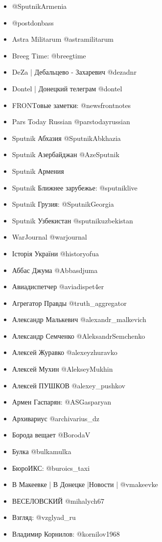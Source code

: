\begin{itemize}

\item @SputnikArmenia
\item @postdonbass 
\item Astra Militarum @astramilitarum
\item Breeg Time: @breegtime
\item DeZa | Дебальцево - Захаревич @dezadnr
\item Dontel | Донецкий телеграм @dontel 
\item FRONTовые заметки: @newsfrontnotes
\item Pars Today Russian @parstodayrussian 
\item Sputnik Абхазия @SputnikAbkhazia
\item Sputnik Азербайджан @AzeSputnik
\item Sputnik Армения 
\item Sputnik Ближнее зарубежье: @sputniklive
\item Sputnik Грузия: @SputnikGeorgia
\item Sputnik Узбекистан @sputnikuzbekistan
\item WarJournal @warjournal
\item Історія України @historyofua
\item Аббас Джума @Abbasdjuma
\item Авиадиспетчер @aviadispet4er 
\item Агрегатор Правды @truth\_aggregator
\item Александр Малькевич @alexandr\_malkevich 
\item Александр Семченко @AleksandrSemchenko
\item Алексей Журавко @alexeyzhuravko
\item Алексей Мухин @AlekseyMukhin
\item Алексей ПУШКОВ @alexey\_pushkov
\item Армен Гаспарян: @ASGasparyan
\item Архивариус @archivarius\_dz
\item Борода вещает @BorodaV
\item Булка @bulkamulka
\item БюроИКС: @buroics\_taxi
\item В Макеевке | В Донецке |Новости | @vmakeevke
\item ВЕСЕЛОВСКИЙ @mihalych67
\item Взгляд: @vzglyad\_ru
\item Владимир Корнилов: @kornilov1968 

\end{itemize}
